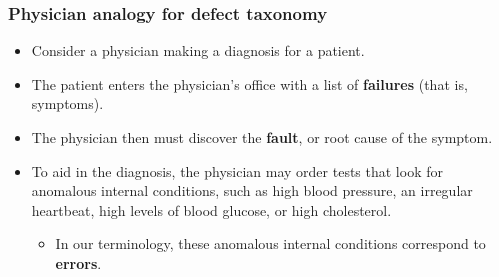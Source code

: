 \begin{frame}[hasprev=false, hasnext=false]
\label{example:physician-analogy-for-defect-taxonomy}
\frametitle{Physician analogy for defect taxonomy}

\begin{itemize}
	\item Consider a physician making a diagnosis for a patient.

	\item The patient enters the physician's office with a list of
	\textbf{failures} (that is, symptoms).

	\item The physician then must discover the \textbf{fault}, or root cause of
	the symptom.

	\item To aid in the diagnosis, the physician may order tests that look for
	anomalous internal conditions, such as high blood pressure, an irregular
	heartbeat, high levels of blood glucose, or high cholesterol.
	\begin{itemize}
		\item In our terminology, these anomalous internal conditions
		correspond to \textbf{errors}.
	\end{itemize}
\end{itemize}
\end{frame}